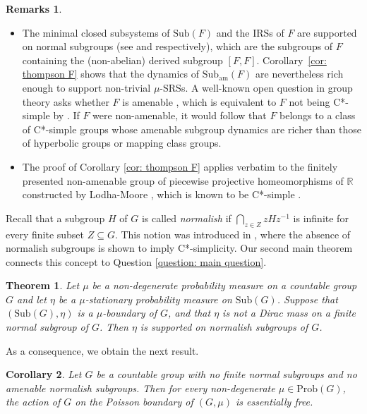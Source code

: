 \documentclass[reqno,a4paper,11pt]{amsart}
\numberwithin{equation}{section}
\newcommand{\1}{\mathbf{1}}
\newcommand{\subam}[1]{\mathrm{Sub}_{\mathrm{am}}(#1)}
\newtheorem{thmA}{Theorem}
\newtheorem{corA}[thmA]{Corollary}
\theoremstyle{definition}
\newtheorem*{rmks}{Remarks}
\begin{document}
\begin{rmks}
	\ 
	
	\begin{itemize}
		\item The minimal closed subsystems of $\mathrm{Sub}(F)$ and the IRSs of $F$ are supported on normal subgroups (see \cite[Theorem 1.7, (i)]{LeBoudecMatteBon2018} and \cite{DudkoMedynets2014} respectively), which are the subgroups of $F$ containing the (non-abelian) derived subgroup $[F,F]$. Corollary~\ref{cor: thompson F} shows that the dynamics of $\subam{F}$ are nevertheless rich enough to support non-trivial $\mu$-SRSs. A well-known open question in group theory asks whether $F$ is amenable \cite{CannonFloydParry1996}, which is equivalent to $F$ not being C*-simple by \cite[Theorem 1.6]{LeBoudecMatteBon2018}. If $F$ were non-amenable, it would follow that $F$ belongs to a class of C*-simple groups whose amenable subgroup dynamics are richer than those of hyperbolic groups or mapping class groups.
		\item The proof of Corollary \ref{cor: thompson F} applies verbatim to the finitely presented non-amenable group of piecewise projective homeomorphisms of $\mathbb{R}$ constructed by Lodha-Moore \cite{LodhaMoore2016}, which is known to be C*-simple \cite[Theorem 1.10]{LeBoudecMatteBon2018}.
	\end{itemize}
\end{rmks}


Recall that a subgroup $H$ of $G$ is called \emph{normalish} if $\bigcap_{z \in Z} zHz^{-1}$ is infinite for every finite subset $Z \subseteq G$. This notion was introduced in \cite[Section 6]{BreuillardKalantarKennedyOzawa2017}, where the absence of normalish subgroups is shown to imply C*-simplicity. Our second main theorem connects this concept to Question \ref{question: main question}.

\begin{thmA}\label{thm: normalish}
	Let $\mu$ be a non-degenerate probability measure on a countable group $G$ and let $\eta$ be a $\mu$-stationary probability measure on $\mathrm{Sub}(G)$. Suppose that $(\mathrm{Sub}(G),\eta)$ is a $\mu$-boundary of $G$, and that $\eta$ is not a Dirac mass on a finite normal subgroup of $G$. Then $\eta$ is supported on normalish subgroups of $G$. 
\end{thmA}

As a consequence, we obtain the next result.
\begin{corA}\label{cor: essentially free}
	Let $G$ be a countable group with no finite normal subgroups and no amenable normalish subgroups. Then for every non-degenerate $\mu \in \mathrm{Prob}(G)$, the action of $G$ on the Poisson boundary of $(G, \mu)$ is essentially free.
\end{corA}
\end{document}
